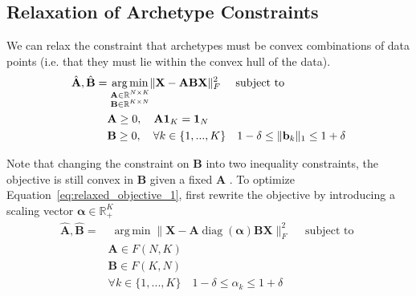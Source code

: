 \documentclass{article}
\DeclareMathOperator*{\argmin}{arg\,min}
\begin{document}
\subsection{Relaxation of Archetype Constraints}
\label{subsec:relaxation_archetype_constraints}

We can relax the constraint that archetypes must be convex combinations of data points (i.e. that they must lie within the convex hull of the data).
\begin{equation}
\label{eq:relaxed_objective_1}
    \begin{aligned}
        \hat{\mathbf{A}}, \hat{\mathbf{B}} =& \; \underset{\begin{subarray}{c} \mathbf{A} \in \mathbb{R}^{N \times K} \\
        \mathbf{B} \in \mathbb{R}^{K \times N} \end{subarray}}{\argmin}
        \| {\mathbf{X}} - {\mathbf{A}} \mathbf{B} \mathbf{X}\|_F^2 \quad \text{ subject to } \\
        & \mathbf{A} \geq 0, \quad \mathbf{A} \mathbf{1}_K = \mathbf{1}_N \\
        & \mathbf{B} \geq 0, \quad \forall k \in \{1, ..., K\} \quad 1 - \delta \leq \| \mathbf{b}_k \|_1 \leq 1 + \delta
    \end{aligned}
\end{equation}

Note that changing the constraint on $\mathbf{B}$ into two inequality constraints, the objective is still convex in $\mathbf{B}$ given a fixed $\mathbf{A}$ \autocite{morupArchetypalAnalysisMachine2012}. To optimize Equation~\ref{eq:relaxed_objective_1}, \textcite{morupArchetypalAnalysisMachine2012} first rewrite the objective by introducing a scaling vector $\boldsymbol{\alpha} \in \mathbb{R}_+^K$
\begin{equation}
\label{eq:relaxed_objective_2}
    \begin{aligned}
        \hat{\mathbf{A}}, \hat{\mathbf{B}} =& \; \underset{}{\argmin}
        \| {\mathbf{X}} - {\mathbf{A}} \operatorname{diag}(\boldsymbol{\alpha}) \mathbf{B} \mathbf{X}\|_F^2 \quad \text{ subject to } \\
        & \mathbf{A} \in F(N, K) \\
        & \mathbf{B} \in F(K, N) \\
        & \forall k \in \{1, ..., K\} \quad 1 - \delta \leq \alpha_k \leq 1 + \delta
    \end{aligned}
\end{equation}
\end{document}
